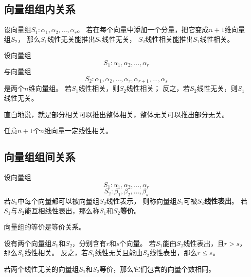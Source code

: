 \subsection{向量组组内关系}
\begin{theorem}[接长与补短]
  设向量组$S_1: \alpha_1,\alpha_2,\dots,\alpha_r$。
  若在每个向量中添加一个分量，把它变成$n+1$维向量组$S_2$，
  那么$S_1$线性无关能推出$S_2$线性无关，
  $S_2$线性相关能推出$S_1$线性相关。
\end{theorem}

\begin{theorem}[部分与整体]
  设向量组
  \[ S_1: \alpha_1,\alpha_2,\dots,\alpha_r \]
  与向量组
  \[ S_2: \alpha_1,\alpha_2,\dots,\alpha_r,\alpha_{r+1},\dots,\alpha_s \]
  是两个$n$维向量组。
  若$S_1$线性相关，则$S_2$线性相关；
  反之，若$S_2$线性无关，则$S_1$线性无关。
\end{theorem}

\begin{remark}
  直白地说，就是部分相关可以推出整体相关，整体无关可以推出部分无关。
\end{remark}

\begin{theorem}
  任意$n+1$个$n$维向量一定线性相关。
\end{theorem}

\subsection{向量组组间关系}
\begin{definition}[向量组等价]
  设向量组
  \[ S_1: \alpha_1,\alpha_2,\dots,\alpha_r \]
  \[ S_2: \beta_1,\beta_2,\dots,\beta_s \]
  若$S_1$中每个向量都可以被向量组$S_2$线性表示，
  则称向量组$S_1$可被$S_2$\textbf{线性表出}。
  若$S_1$与$S_2$能互相线性表出，那么称$S_1$和$S_2$\textbf{等价}。
\end{definition}

\begin{remark}
  向量组的等价是等价关系。
\end{remark}

\begin{theorem} \label{thrm:vector-set-size}
  设有两个向量组$S_1$和$S_2$，分别含有$r$和$s$个向量。
  若$S_1$能由$S_2$线性表出，且$r > s$，那么$S_1$线性相关。
  反之，若$S_1$线性无关且能由$S_2$线性表出，那么$r \le s$。
\end{theorem}

\begin{corollary} \label{thrm:vector-set-equiv}
  若两个线性无关的向量组$S_1$和$S_2$等价，那么它们包含的向量个数相同。
\end{corollary}

